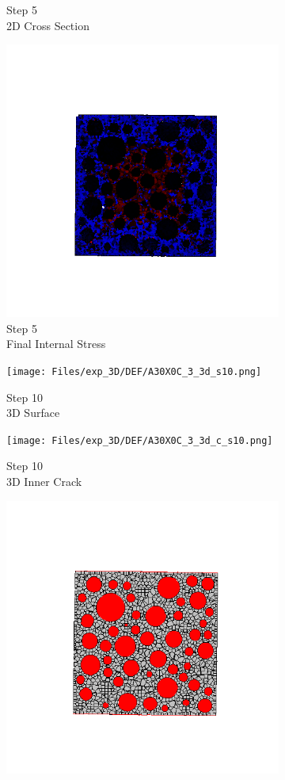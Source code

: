 \begin{figure}[ht!]
\begin{subfigure}{.25\textwidth}
      \caption{Step 5\\2D Cross Section}
    \end{subfigure}%
    \begin{subfigure}{.25\textwidth}
      \centering
      \includegraphics[width=.8\linewidth]{Files/exp_3D/DEF/A30X0C_3_s5.png}
      \caption{Step 5\\Final Internal Stress}
    \end{subfigure}
    \begin{subfigure}{.25\textwidth}
      \centering
      \texttt{[image: Files/exp\_3D/DEF/A30X0C\_3\_3d\_s10.png]}
      \caption{Step 10\\3D Surface}
    \end{subfigure}%
    \begin{subfigure}{.25\textwidth}
      \centering
      \texttt{[image: Files/exp\_3D/DEF/A30X0C\_3\_3d\_c\_s10.png]}
      \caption{Step 10\\3D Inner Crack}
    \end{subfigure}%
    \begin{subfigure}{.25\textwidth}
      \centering
      \includegraphics[width=.8\linewidth]{Files/exp_3D/DEF/A30X0C_3_c10.png}

\end{subfigure}
\end{figure}
